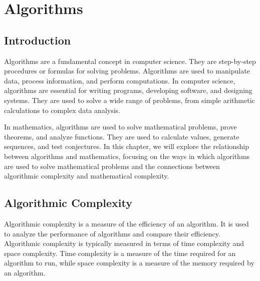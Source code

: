 \chapter{Algorithms}

\section{Introduction}

Algorithms are a fundamental concept in computer science. They are step-by-step procedures or formulas for solving problems. Algorithms are used to manipulate data, process information, and perform computations. In computer science, algorithms are essential for writing programs, developing software, and designing systems. They are used to solve a wide range of problems, from simple arithmetic calculations to complex data analysis.

In mathematics, algorithms are used to solve mathematical problems, prove theorems, and analyze functions. They are used to calculate values, generate sequences, and test conjectures. In this chapter, we will explore the relationship between algorithms and mathematics, focusing on the ways in which algorithms are used to solve mathematical problems and the connections between algorithmic complexity and mathematical complexity.

\section{Algorithmic Complexity}

Algorithmic complexity is a measure of the efficiency of an algorithm. It is used to analyze the performance of algorithms and compare their efficiency. Algorithmic complexity is typically measured in terms of time complexity and space complexity. Time complexity is a measure of the time required for an algorithm to run, while space complexity is a measure of the memory required by an algorithm.